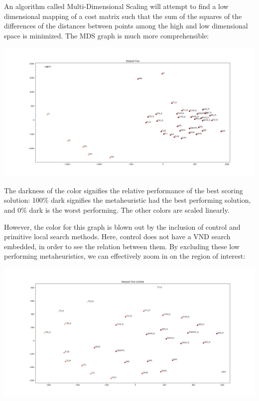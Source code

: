 \documentclass[11pt, letterpaper, onecolumn]{article}
\begin{document}
\begin{table}[htbp]
\end{table}

An algorithm called Multi-Dimensional Scaling will attempt to find a low dimensional mapping of a cost matrix such that the sum of the squares of the differences of the distances between points among the high and low dimensional space is minimized. The MDS graph is much more comprehensible:

\includegraphics[width=\linewidth]{graphs/ds5_matrix.png}

The darkness of the color signifies the relative performance of the best scoring solution: 100\% dark signifies the metaheuristic had the best performing solution, and 0\% dark is the worst performing. The other colors are scaled linearly. 

However, the color for this graph is blown out by the inclusion of control and primitive local search methods. Here, control does not have a VND search embedded, in order to see the relation between them. By excluding these low performing metaheuristics, we can effectively zoom in on the region of interest: 

\includegraphics[width=\linewidth]{graphs/ds5_matrix_limited.png}
\end{document}
